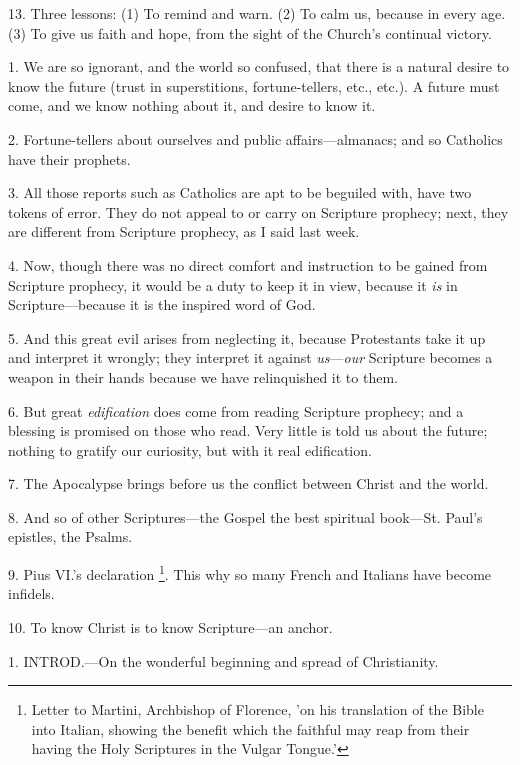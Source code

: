 13. Three lessons: (1) To remind and warn. (2) To
calm us, because in every age. (3) To give us faith and hope, from the
sight of the Church's continual victory.


1. We are so ignorant, and the world so confused,
that there is a natural desire to know the future (trust in
superstitions, fortune-tellers, etc., etc.). A future must come, and
we know nothing about it, and desire to know it.

2. Fortune-tellers about ourselves and public
affairs—almanacs; and so Catholics have their prophets.

3. All those reports such as Catholics are apt to
be beguiled with, have two tokens of error. They do not appeal to or
carry on Scripture prophecy; next, they are different from Scripture
prophecy, as I said last week.

4. Now, though there was no direct comfort and
instruction to be gained from Scripture prophecy, it would be a duty
to keep it in view, because it \emph{is} in Scripture—because it is
the inspired word of God.

5. And this great evil arises from neglecting it,
because Protestants take it up and interpret it wrongly; they
interpret it against \emph{us}—\emph{our} Scripture becomes a weapon
in their hands because we have relinquished it to them.

6. But great \emph{edification} does come from
reading Scripture prophecy; and a blessing is promised on those who
read. Very little is told us about the future; nothing to
gratify our curiosity, but with it real edification.

7. The Apocalypse brings before us the conflict
between Christ and the world.

8. And so of other Scriptures—the Gospel the
best spiritual book—St. Paul's epistles, the Psalms.

9. Pius VI.'s
declaration \footnote{Letter to Martini,
Archbishop of Florence, 'on his translation of the Bible into Italian,
showing the benefit which the faithful may reap from their having the
Holy Scriptures in the Vulgar Tongue.'}. This why
so many French and Italians have become infidels.

10. To know Christ is to know Scripture—an
anchor.


1. INTROD.—On
the wonderful beginning and spread of Christianity.

